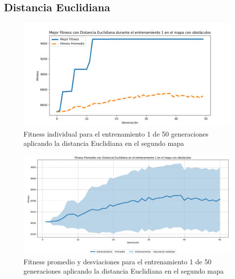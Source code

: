 \documentclass[conference]{IEEEtran}
\begin{document}
\subsection{Distancia Euclidiana}
\setcounter{figure}{0}
\renewcommand{\thefigure}{S\arabic{figure}-EM2}

\begin{figure}[H]
    \centering
    \includegraphics[width=0.9 \linewidth]{Euclidiana/Mapa2/Fitness_1_Map2_Eucli_50Gen.png}
    \caption{Fitness individual para el entrenamiento 1 de 50 generaciones aplicando la distancia Euclidiana en el segundo mapa}
    \label{fig:eucli_1_50_m2}
\end{figure}
\begin{figure}[H]
    \centering
    \includegraphics[width=0.9 \linewidth]{Euclidiana/Mapa2/Fitness_1_Map2_Eucli_50Gen_Sombra.png}
    \caption{Fitness promedio y desviaciones para el entrenamiento 1 de 50 generaciones aplicando la distancia Euclidiana en el segundo mapa}
    \label{fig:eucli_1_50_sombra_m2}
\end{figure}
\end{document}
